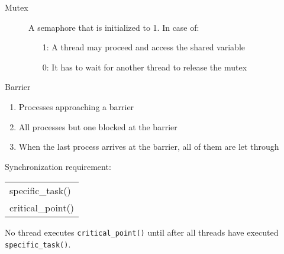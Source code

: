 \begin{frame}
  \begin{description}
  \item[Mutex] A semaphore that is initialized to 1. In case of:
    \begin{itemize}
    \item[1:] A thread may proceed and access the shared variable
    \item[0:] It has to wait for another thread to release the mutex
    \end{itemize}
  \end{description}
  \begin{center}
  \end{center}
\end{frame}

\begin{frame}
\begin{center}
\end{center}
\end{frame}

\begin{frame}
\begin{center}
\end{center}
\end{frame}

\begin{frame}{Barrier}
  \begin{center}
  \end{center}
  \begin{enumerate}
  \item Processes approaching a barrier
  \item All processes but one blocked at the barrier
  \item When the last process arrives at the barrier, all of them are let through
  \end{enumerate}
  \begin{block}{Synchronization requirement:}
    \begin{center}\ttfamily
      \begin{tabular}{l}
        specific\_task()\\
        critical\_point()
      \end{tabular}
    \end{center}
    No thread executes \texttt{critical\_point()} until after all threads have executed
    \texttt{specific\_task()}.
  \end{block}
\end{frame}

